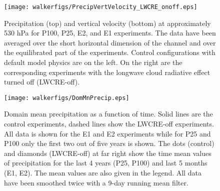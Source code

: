 \documentclass[draft]{agujournal2019}
\begin{document}
\begin{figure}
  \centering
      \texttt{[image: walkerfigs/PrecipVertVelocity\_LWCRE\_onoff.eps]}
  \caption{Precipitation (top) and vertical velocity (bottom) at approximately 530 hPa for P100, P25, E2, and E1 experiments.  
  The data have been averaged over the short horizontal dimension of the channel and over the 
  equilibrated part of the experiments.  Control configurations with default model physics are on the 
  left.  On the right are the corresponding experiments with the longwave cloud radiative effect turned
  off (LWCRE-off).}
  \label{fig:precip_vertvel}
\end{figure}
%
%
%

\begin{figure}
  \centering
      \texttt{[image: walkerfigs/DomMnPrecip.eps]}
  \caption{Domain mean precipitation as a function of time.
  Solid lines are the control experiments, dashed lines show the LWCRE-off experiments.  All data is shown for the E1 and E2 experiments
  while for P25 and P100 only the first two out of five years is shown.  The dots (control) and diamonds (LWCRE-off) at far right show the time 
  mean values of precipitation for the 
  last 4 years (P25, P100) and last 5 months (E1, E2).  The mean values are also given in the legend. 
  All data have been smoothed twice with a 9-day running mean filter.  }
    \label{fig:precip_dom_mn}
\end{figure}
\end{document}
